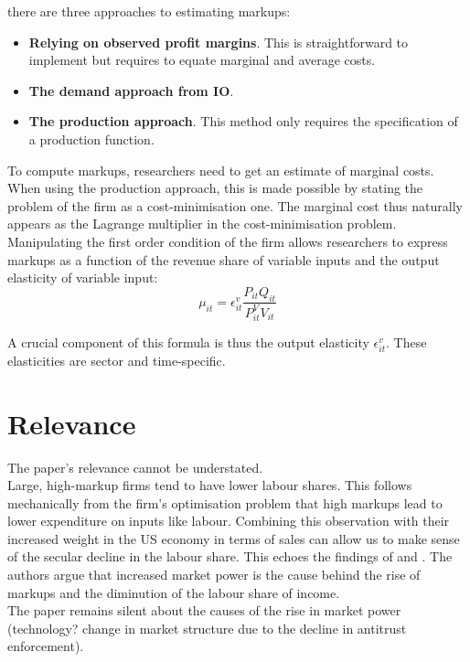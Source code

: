 \documentclass{amsart}
\theoremstyle{definition}
\theoremstyle{remark}
\numberwithin{equation}{section}
\begin{document}
there are three approaches to estimating markups:
\begin{itemize}
    \item \textbf{Relying on observed profit margins}. This is straightforward to implement but requires to equate marginal and average costs.
    \item \textbf{The demand approach from IO}.
    \item \textbf{The production approach}. This method only requires the specification of a production function.
\end{itemize}

To compute markups, researchers need to get an estimate of marginal costs. When using the production approach, this is made possible by stating the problem of the firm as a cost-minimisation one. The marginal cost thus naturally appears as the Lagrange multiplier in the cost-minimisation problem. Manipulating the first order condition of the firm allows researchers to express markups as a function of the revenue share of variable inputs and the output elasticity of variable input: $$\mu_{i t}=\epsilon_{i t}^v \frac{P_{i t} Q_{i t}}{P_{i t}^{V} V_{i t}}$$

A crucial component of this formula is thus the output elasticity $\epsilon_{i t}^v$. These elasticities are sector and time-specific.\\

\section{Relevance}

The paper's relevance cannot be understated.\\

Large, high-markup firms tend to have lower labour shares. This follows mechanically from the firm's optimisation problem that high markups lead to lower expenditure on inputs like labour. Combining this observation with their increased weight in the US economy in terms of sales can allow us to make sense of the secular decline in the labour share. This echoes the findings of \cite{autor2017fall} and \cite{kehrig2017growing}. The authors argue that increased market power is the cause behind the rise of markups and the diminution of the labour share of income.\\

The paper remains silent about the causes of the rise in market power (technology? change in market structure due to the decline in antitrust enforcement).
\end{document}
